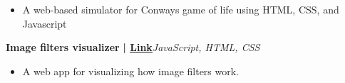 \documentclass[a4paper]{article}
\begin{document}
\begin{itemize} \itemsep -3pt
\item[] A web-based simulator for Conway\textquotesingle{}s game of life using HTML, CSS, and Javascript
\end{itemize}
          \vspace*{3mm}
      {\textbf{Image filters visualizer}}\textbf{ | \href{https://github.com/syedhuzaif199/image-filters-visualization}{\underline{Link}}}\hfill{\sl JavaScript, HTML, CSS}\\
          \vspace{-1mm}
\begin{itemize} \itemsep -3pt
\item[] A web app for visualizing how image filters work.
\end{itemize}
          \vspace*{3mm}

    \ 
    
\end{document}
